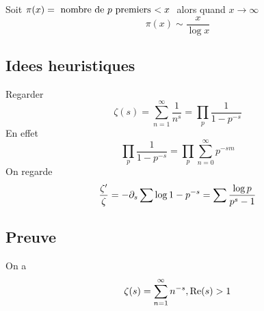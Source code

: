 \documentclass[../main.tex]{subfiles}
\begin{document}
\begin{thm}
	Soit $\pi( x) = \text{ nombre de $p$ premiers $ < x$  } $ alors quand $x\to \infty $ 
	\[ 
	\pi( x) \sim \frac{x}{\log x}
	\]
	
\end{thm}
\subsection*{Idees heuristiques}
Regarder 
\[ 
\zeta( s) = \sum_{n=1}^{ \infty } \frac{1}{n^{s}} = \prod_p \frac{1}{1- p^{-s}}
\]
En effet
\[ 
\prod_p \frac{1}{1-p^{-s}}=\prod_p \sum_{n=0}^{ \infty } p^{-sm}
\]
On regarde
\[ 
\frac{\zeta'}{\zeta} = -\partial_s \sum \log {1-p^{-s}} = \sum \frac{\log p}{p^{s}-1}
\]
\subsection*{Preuve}
On a
\[ 
\zeta( s) = \sum_{n=1}^{ \infty }n^{-s}, \operatorname{Re}( s) >1
\]
\end{document}
